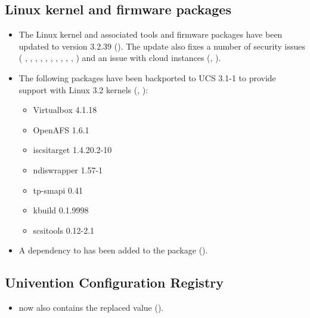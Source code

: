 \subsection{Linux kernel and firmware packages}
\begin{itemize}
\item The Linux kernel and associated tools and firmware packages have
	been updated to version 3.2.39 (). The update also fixes
	a number of security issues (%
	,
	,
	,
	,
	,
	,
	,
	,
	,
	,
	)
	and an issue with cloud instances (, ).
\item The following packages have been backported to UCS 3.1-1 to provide support with Linux 3.2 kernels (, ):
 \begin{itemize}
  \item Virtualbox 4.1.18
  \item OpenAFS 1.6.1
  \item iscsitarget 1.4.20.2-10
  \item ndiswrapper 1.57-1
  \item tp-smapi 0.41
  \item kbuild 0.1.9998
  \item scsitools 0.12-2.1
 \end{itemize}

\item A dependency to  has been
  added to the package  ().
\end{itemize}

\subsection{Univention Configuration Registry}
\begin{itemize}
\item {} now also contains the replaced value ().
\end{itemize}


